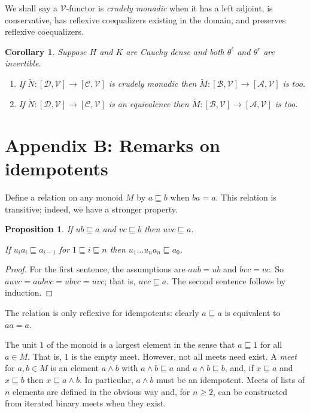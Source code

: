 \documentclass[a4paper,12pt,reqno]{amsart}
\newtheorem{proposition}[theorem]{Proposition}
\newtheorem{corollary}[theorem]{Corollary}
\theoremstyle{definition}
\theoremstyle{fact}
\theoremstyle{genquest}
\theoremstyle{step}
\newcommand{\dd}{\colon}
\newcommand{\ra}{\rightarrow}
\def\CA{{\mathscr A}}
\def\CB{{\mathscr B}}
\def\CC{{\mathscr C}}
\def\CD{{\mathscr D}}
\def\CV{{\mathscr V}}
\begin{document}
We shall say a $\CV$-functor is {\em crudely monadic} when it has a left adjoint,
is conservative, has reflexive coequalizers existing in the domain, and preserves
reflexive coequalizers.

\begin{corollary}\label{gencor}
Suppose $H$ and $K$ are Cauchy dense and both $\theta^{\ell}$ and $\theta^{r}$
are invertible. 
\begin{enumerate}
\item[(a)] If $\widetilde{N}\dd [\CD,\CV]\ra [\CC,\CV]$ is crudely monadic then $\widetilde{M}\dd [\CB,\CV]\ra [\CA,\CV]$ is too. 
\item[(b)] If $\widetilde{N}\dd [\CD,\CV]\ra [\CC,\CV]$ is an equivalence then $\widetilde{M}\dd [\CB,\CV]\ra [\CA,\CV]$ is too. 
\end{enumerate}
\end{corollary}

\section{Appendix B: Remarks on idempotents}\label{idemp}

Define a relation on any monoid $M$ by $a\sqsubseteq b$ when $ba = a$.
This relation is transitive; indeed, we have a stronger property.

\begin{proposition}\label{gentrans}
If $ub\sqsubseteq a$ and $vc \sqsubseteq b$ then $uvc\sqsubseteq a$.

If $u_ia_i\sqsubseteq a_{i-1}$ for $1\sqsubseteq i\sqsubseteq n$ then $u_1\dots u_na_n\sqsubseteq a_0$.
\end{proposition}
\begin{proof}
For the first sentence, the assumptions are $aub = ub$ and $bvc=vc$.
So $auvc = aubvc=ubvc=uvc$; that is, $uvc \sqsubseteq a$. 
The second sentence follows by induction.
\end{proof}

The relation is only reflexive for idempotents: clearly $a\sqsubseteq a$ is equivalent to $aa=a$.

The unit $1$ of the monoid is a largest element in the sense that $a\sqsubseteq 1$ for all $a\in M$.
That is, $1$ is the empty meet. 
However, not all meets need exist. A {\em meet} for $a,b\in M$ is an element $a\wedge b$
with $a\wedge b \sqsubseteq a$ and $a\wedge b \sqsubseteq b$, and, if $x\sqsubseteq a$ and $x\sqsubseteq b$ then
$x\sqsubseteq a\wedge b$. In particular, $a\wedge b$ must be an idempotent. 
Meets of lists of $n$ elements are defined in the obvious way and, for $n\ge 2$,
can be constructed from iterated binary meets when they exist. 
\end{document}

